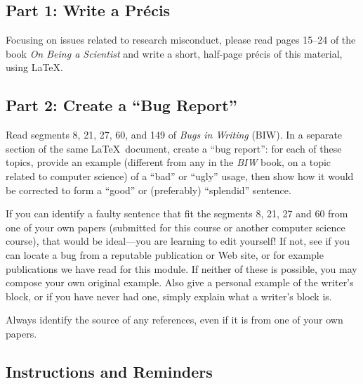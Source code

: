 

\usepackage[compact]{titlesec}




\subsection*{Part 1: Write a Pr\'{e}cis}

Focusing on issues related to research misconduct, please read pages 15--24 of the book {\em On Being a Scientist} and write a short,
half-page pr\'{e}cis of this material, using \LaTeX.

\subsection*{Part 2: Create a ``Bug Report''}

Read segments 8, 21, 27, 60, and 149 of {\em Bugs in Writing} (BIW).  In a separate section of the same \LaTeX\
document, create a ``bug report'': for each of these topics, provide an example (different from any in the {\em BIW}
book, on a topic related to computer science) of a ``bad'' or ``ugly'' usage, then show how it would be corrected to
form a ``good'' or (preferably) ``splendid'' sentence.

If you can identify a faulty sentence that fit the segments 8, 21, 27 and 60 from one of your own papers (submitted for
this course or another computer science course), that would be ideal---you are learning to edit yourself!  If not, see
if you can locate a bug from a reputable publication or Web site, or for example publications we have read for this
module. If neither of these is possible, you may compose your own original example. Also give a personal example of the
writer's block, or if you have never had one, simply explain what a writer's block is.

Always identify the source of any references, even if it is from one of your own papers.

\subsection*{Instructions and Reminders}

